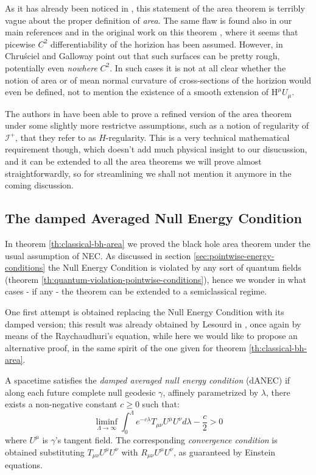 \begin{remark}
	As it has already been noticed in \cite[]{chrusciel2001regularity}, this statement of the area theorem is terribly vague about the proper definition of \emph{area}. The same flaw is found also in our main references \cite[]{wald2010general, hawking1973large} and in the original work on this theorem \cite[]{hawking1972black}, where it seems that picewise \(C^2\) differentiability of the horizion has been assumed. However, in \cite[]{chrusciel1998horizons} Chru\'sciel and Galloway point out that such surfaces can be pretty rough, potentially even \emph{nowhere} \(C^2\). In such cases it is not at all clear whether the notion of area or of mean normal curvature of cross-sections of the horizion would even be defined, not to mention the existence of a smooth extension of \(\mathrm{H}^{\mu}U_{\mu}\). 

	The authors in \cite[]{chrusciel2001regularity} have been able to prove a refined version of the area theorem under some slightly more restrictve assumptions, such as a notion of regularity of \(\mathscr{I}^+\), that they refer to as \(H\)-regularity. This is a very technical mathematical requirement though, which doesn't add much physical insight to our disucussion, and it can be extended to all the area theorems we will prove almost straightforwardly, so for streamlining we shall not mention it anymore in the coming discussion.
\end{remark}

\subsection{The damped Averaged Null Energy Condition}
\label{subsec:dANEC-area-theorem}
In theorem \ref{th:classical-bh-area} we proved the black hole area theorem under the usual assumption of NEC. As discussed in section \ref{sec:pointwise-energy-conditions} the Null Energy Condition is violated by any sort of quantum fields (theorem \ref{th:quantum-violation-pointwise-conditions}), hence we wonder in what cases - if any - the theorem can be extended to a semiclassical regime.

One first attempt is obtained replacing the Null Energy Condition with its damped version; this result was already obtained by Lesourd in \cite{lesourd2018remark}, once again by means of the Raychaudhuri's equation, while here we would like to propose an alternative proof, in the same spirit of the one given for theorem \ref{th:classical-bh-area}.
\begin{definition}
	A spacetime satisfies the \emph{damped averaged null energy condition} (dANEC) if along each future complete null geodesic \(\gamma\), affinely parametrized by \(\lambda\), there exists a non-negative constant \(c\ge 0\) such that:
	\[
	\liminf\limits_{\Lambda\rightarrow \infty} \int_{0}^{\Lambda} e^{-c\lambda}T_{\mu\nu}U^{\mu}U^{\nu}d\lambda - \frac{c}{2} > 0
	\]
	where \(U^{\mu}\) is \(\gamma\)'s tangent field. The corresponding \emph{convergence condition} is obtained substituting \(T_{\mu\nu}U^{\mu}U^{\nu}\) with \(R_{\mu\nu}U^{\mu}U^{\nu}\), as guaranteed by Einstein equations.
\end{definition}

